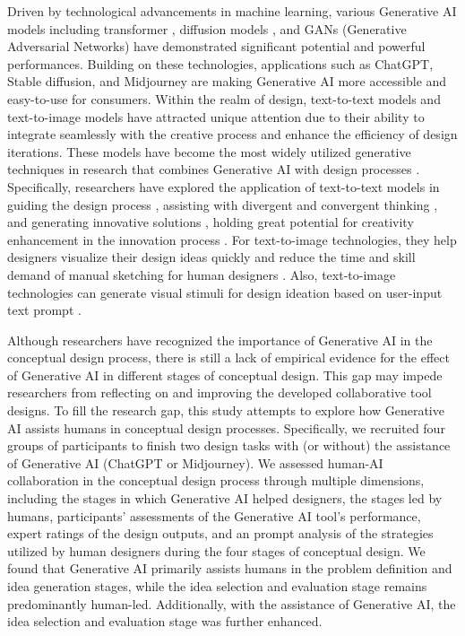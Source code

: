 \documentclass{dsj}
\begin{document}
Driven by technological advancements in machine learning, various Generative AI models including transformer \citep{vaswani2017attention}, diffusion models \citep{ho2020denoising}, and GANs (Generative Adversarial Networks) \citep{karras2019style} have demonstrated significant potential and powerful performances. Building on these technologies, applications such as ChatGPT, Stable diffusion, and Midjourney are making Generative AI more accessible and easy-to-use for consumers. Within the realm of design, text-to-text models and text-to-image models have attracted unique attention due to their ability to integrate seamlessly with the creative process and enhance the efficiency of design iterations. These models have become the most widely utilized generative techniques in research that combines Generative AI with design processes \citep{wu2024integrating}. Specifically, researchers have explored the application of text-to-text models in guiding the design process \citep{chen2024designfusion}, assisting with divergent and convergent thinking \citep{wang2023popblends}, and generating innovative solutions \citep{zhu2023generative}, holding great potential for creativity enhancement in the innovation process \citep{sarica2024innovation}. For text-to-image technologies, they help designers visualize their design ideas quickly and reduce the time and skill demand of manual sketching for human designers \citep{choi2024creativeconnect}. Also, text-to-image technologies can generate visual stimuli for design ideation based on user-input text prompt \citep{liu20233dall, wadinambiarachchi2024effects}.

Although researchers have recognized the importance of Generative AI in the conceptual design process, there is still a lack of empirical evidence for the effect of Generative AI in different stages of conceptual design. This gap may impede researchers from reflecting on and improving the developed collaborative tool designs. To fill the research gap, this study attempts to explore how Generative AI assists humans in conceptual design processes. Specifically, we recruited four groups of participants to finish two design tasks with (or without) the assistance of Generative AI (ChatGPT or Midjourney). We assessed human-AI collaboration in the conceptual design process through multiple dimensions, including the stages in which Generative AI helped designers, the stages led by humans, participants’ assessments of the Generative AI tool’s performance, expert ratings of the design outputs, and an prompt analysis of the strategies utilized by human designers during the four stages of conceptual design. We found that Generative AI primarily assists humans in the problem definition and idea generation stages, while the idea selection and evaluation stage remains predominantly human-led. Additionally, with the assistance of Generative AI, the idea selection and evaluation stage was further enhanced.
\end{document}

